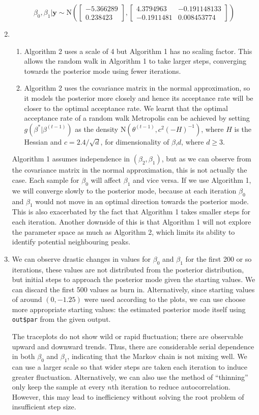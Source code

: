 \documentclass[a4paper,12pt]{article}\usepackage[]{graphicx}\usepackage[]{color}
\newcommand{\by}{\mathbf{y}}
\newcommand{\N}{\mathrm{N}}
\begin{document}
\begin{enumerate}[label=(\alph*)]
$$\beta_0,\beta_1|\by\sim\N\left(\begin{bmatrix}
-5.366289 \\
0.238423
\end{bmatrix},\begin{bmatrix}
4.3794963 & -0.191148133 \\
-0.1911481 & 0.008453774
\end{bmatrix}\right)$$
\item 
\begin{enumerate}[label=(\roman*)]
	\item Algorithm 2 uses a scale of 4 but Algorithm 1 has no scaling factor. This allows the random walk in Algorithm 1 to take larger steps, converging towards the posterior mode using fewer iterations.
	\item Algorithm 2 uses the covariance matrix in the normal approximation, so it models the posterior more closely and hence its acceptance rate will be closer to the optimal acceptance rate. We learnt that the optimal acceptance rate of a random walk Metropolis can be achieved by setting $g(\beta^*|\beta^{(t-1)})$ as the density $\N(\theta^{(t-1)},c^2(-H)^{-1})$, where $H$ is the Hessian and $c=2.4/\sqrt{d}$, for dimensionality of $\beta$,$d$, where $d\geq 3$.
\end{enumerate}
Algorithm 1 assumes independence in $(\beta_2,\beta_1)$, but as we can observe from the covariance matrix in the normal approximation, this is not actually the case. Each sample for $\beta_0$ will affect $\beta_1$ and vice versa. If we use Algorithm 1, we will converge slowly to the posterior mode, because at each iteration $\beta_0$ and $\beta_1$ would not move in an optimal direction towards the posterior mode. This is also exacerbated by the fact that Algorithm 1 takes smaller steps for each iteration. Another downside of this is that Algorithm 1 will not explore the parameter space as much as Algorithm 2, which limits its ability to identify potential neighbouring peaks.

\item We can observe drastic changes in values for $\beta_0$ and $\beta_1$ for the first 200 or so iterations, these values are not distributed from the posterior distribution, but initial steps to approach the posterior mode given the starting values. We can discard the first 500 values as burn in. Alternatively, since starting values of around $(0,-1.25)$ were used according to the plots, we can use choose more appropriate starting values: the estimated posterior mode itself using \verb|out$par| from the given output.

The traceplots do not show wild or rapid fluctuation; there are observable upward and downward trends. Thus, there are considerable serial dependence in both $\beta_0$ and $\beta_1$, indicating that the Markov chain is not mixing well. We can use a larger scale so that wider steps are taken each iteration to induce greater fluctuation. Alternatively, we can also use the method of ``thinning'' only keep the sample at every $n$th iteration to reduce autocorrelation. However, this may lead to inefficiency without solving the root problem of insufficient step size.
\end{enumerate}
\end{document}
